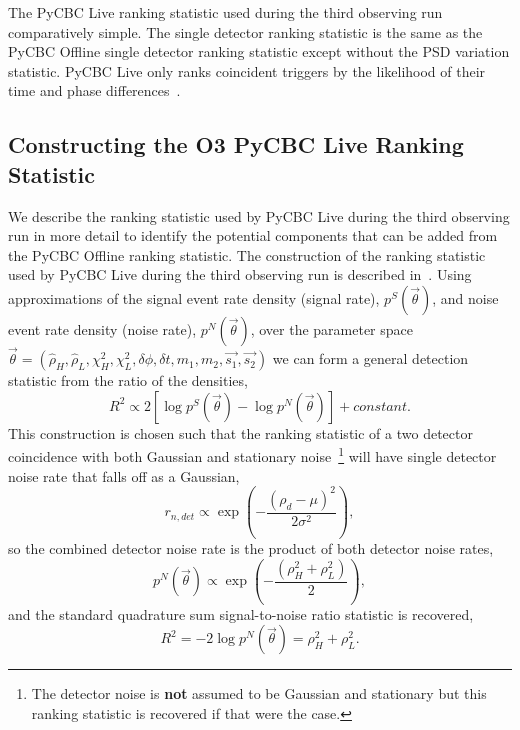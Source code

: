 The PyCBC Live ranking statistic used during the third observing run comparatively simple. The single detector ranking statistic is the same as the PyCBC Offline single detector ranking statistic except without the PSD variation statistic. PyCBC Live only ranks coincident triggers by the likelihood of their time and phase differences~\cite{PyCBC_Live:2018}.

\subsection{\label{5:sec:old-stat-construction}Constructing the O3 PyCBC Live Ranking Statistic}

We describe the ranking statistic used by PyCBC Live during the third observing run in more detail to identify the potential components that can be added from the PyCBC Offline ranking statistic. The construction of the ranking statistic used by PyCBC Live during the third observing run is described in~\cite{PyCBC_Live:2018}. Using approximations of the signal event rate density (signal rate), $p^{S}(\Vec{\theta})$, and noise event rate density (noise rate), $p^{N}(\Vec{\theta})$, over the parameter space $\Vec{\theta} = \left(\hat{\rho}_{H}, \hat{\rho}_{L}, \chi^{2}_{H}, \chi^{2}_{L}, \delta\phi, \delta t, m_{1}, m_{2}, \Vec{s_{1}}, \Vec{s_{2}}\right)$ we can form a general detection statistic from the ratio of the densities,
%
\begin{equation}
    R^{2} \propto 2 [\log p^{S}(\Vec{\theta}) - \log p^{N}(\Vec{\theta})] + constant.
    \label{5:eqn:general-detection-statistic}
\end{equation}
%
This construction is chosen such that the ranking statistic of a two detector coincidence with both Gaussian and stationary noise~\footnote{The detector noise is \textbf{not} assumed to be Gaussian and stationary but this ranking statistic is recovered if that were the case.} will have single detector noise rate that falls off as a Gaussian,
%
\begin{equation}
    r_{n,det} \propto \exp \left( -\frac{(\rho_d - \mu)^2}{2 \sigma^2} \right) ,
    \label{5:eqn:old-noise-rate}
\end{equation}
%
so the combined detector noise rate is the product of both detector noise rates,
%
\begin{equation}
    p^{N}(\Vec{\theta}) \propto \exp \left( -\frac{(\rho_{H}^{2} + \rho_{L}^{2})}{2} \right) ,
    \label{5:eqn:old-comb-noise-rate}
\end{equation}
%
and the standard quadrature sum signal-to-noise ratio statistic is recovered,
%
\begin{equation}
    R^{2} = -2 \log p^{N}(\Vec{\theta}) = \rho^{2}_{H} + \rho^{2}_{L} .
\end{equation}

